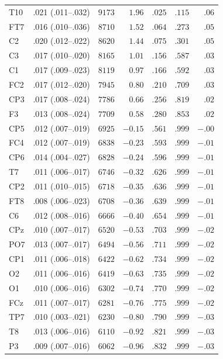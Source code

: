 {\begin{longtable}{llrrrrr}
T10 & .021 (.011--.032) & $9173$ & $1.96$ & $.025$ & $.115$ & $.06$ \\
FT7 & .016 (.010--.036) & $8710$ & $1.52$ & $.064$ & $.273$ & $.05$ \\
C2 & .020 (.012--.022) & $8620$ & $1.44$ & $.075$ & $.301$ & $.05$ \\
C3 & .017 (.010--.020) & $8165$ & $1.01$ & $.156$ & $.587$ & $.03$ \\
C1 & .017 (.009--.023) & $8119$ & $0.97$ & $.166$ & $.592$ & $.03$ \\
FC2 & .017 (.012--.020) & $7945$ & $0.80$ & $.210$ & $.709$ & $.03$ \\
CP3 & .017 (.008--.024) & $7786$ & $0.66$ & $.256$ & $.819$ & $.02$ \\
F3 & .013 (.008--.024) & $7709$ & $0.58$ & $.280$ & $.853$ & $.02$ \\
CP5 & .012 (.007--.019) & $6925$ & $-0.15$ & $.561$ & $.999$ & $-.00$ \\
FC4 & .012 (.007--.019) & $6838$ & $-0.23$ & $.593$ & $.999$ & $-.01$ \\
CP6 & .014 (.004--.027) & $6828$ & $-0.24$ & $.596$ & $.999$ & $-.01$ \\
T7 & .011 (.006--.017) & $6746$ & $-0.32$ & $.626$ & $.999$ & $-.01$ \\
CP2 & .011 (.010--.015) & $6718$ & $-0.35$ & $.636$ & $.999$ & $-.01$ \\
FT8 & .008 (.006--.023) & $6708$ & $-0.36$ & $.639$ & $.999$ & $-.01$ \\
C6 & .012 (.008--.016) & $6666$ & $-0.40$ & $.654$ & $.999$ & $-.01$ \\
CPz & .010 (.007--.017) & $6520$ & $-0.53$ & $.703$ & $.999$ & $-.02$ \\
PO7 & .013 (.007--.017) & $6494$ & $-0.56$ & $.711$ & $.999$ & $-.02$ \\
CP1 & .011 (.006--.018) & $6422$ & $-0.62$ & $.734$ & $.999$ & $-.02$ \\
O2 & .011 (.006--.016) & $6419$ & $-0.63$ & $.735$ & $.999$ & $-.02$ \\
O1 & .010 (.006--.016) & $6302$ & $-0.74$ & $.770$ & $.999$ & $-.02$ \\
FCz & .011 (.007--.017) & $6281$ & $-0.76$ & $.775$ & $.999$ & $-.02$ \\
TP7 & .010 (.003--.021) & $6230$ & $-0.80$ & $.790$ & $.999$ & $-.03$ \\
T8 & .013 (.006--.016) & $6110$ & $-0.92$ & $.821$ & $.999$ & $-.03$ \\
P3 & .009 (.007--.016) & $6062$ & $-0.96$ & $.832$ & $.999$ & $-.03$ \\

\end{longtable}}
